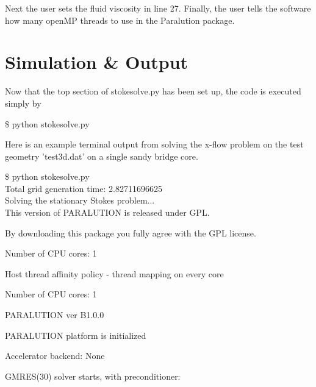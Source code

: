 \documentclass{report}
\begin{document}
\noindent Next the user sets the fluid viscosity in line 27. Finally, the user tells
the software how many openMP threads to use in the Paralution package.

\section{Simulation \& Output}

Now that the top section of stokesolve.py has been set up, the code
is executed simply by
\begin{mdframed}[style=MyFrame]
\$ python stokesolve.py
\end{mdframed}
Here is an example terminal output from solving the x-flow problem
on the test geometry 'test3d.dat' on a single sandy bridge core.
\begin{mdframed}[style=MyFrame]
\footnotesize
\$ python stokesolve.py
\\

\noindent \hspace{.1cm} Total grid generation time: 2.82711696625
\\

\noindent \hspace{.1cm} Solving the stationary Stokes problem...
\\

\noindent \hspace{.1cm} This version of PARALUTION is released under GPL.

\noindent \hspace{.1cm} By downloading this package you fully agree with the GPL license.

\noindent \hspace{.1cm} Number of CPU cores: 1

\noindent \hspace{.1cm} Host thread affinity policy - thread mapping on every core

\noindent \hspace{.1cm} Number of CPU cores: 1

\noindent \hspace{.1cm} PARALUTION ver B1.0.0

\noindent \hspace{.1cm} PARALUTION platform is initialized

\noindent \hspace{.1cm} Accelerator backend: None

\noindent \hspace{.1cm} GMRES(30) solver starts, with preconditioner:


\end{mdframed}
\end{document}
